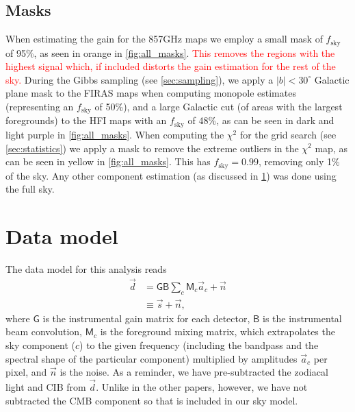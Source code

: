 \documentclass{aa}
\def\,{\thinspace}
\newcommand{\edit}[1]{\textcolor{red}{#1}}
\begin{document}
\subsection{Masks}
\label{sec:masks}
When estimating the gain for the 857\,GHz maps we employ a small mask of $f_\mathrm{sky}$ of 95\%, as seen in orange in \cref{fig:all_masks}. \edit{This removes the regions with the highest signal which, if included distorts the gain estimation for the rest of the sky.}  
During the Gibbs sampling (see \cref{sec:sampling}), we apply a $|b|<30^\circ$ Galactic plane mask to the FIRAS maps when computing monopole estimates (representing an $f_\mathrm{sky}$ of 50\%), and a large Galactic cut (of areas with the largest foregrounds) to the HFI maps with an $f_\mathrm{sky}$ of 48\%, as can be seen in dark and light purple in \cref{fig:all_masks}. 
When computing the $\chi^2$ for the grid search (see \cref{sec:statistics}) we apply a mask to remove the extreme outliers in the $\chi^2$ map, as can be seen in yellow in \cref{fig:all_masks}. This has $f_\mathrm{sky}=0.99$, removing only 1\% of the sky. 
Any other component estimation (as discussed in \cref{sec:skymodel}) was done using the full sky.
\section{Data model}
\label{sec:skymodel}
The data model for this analysis reads
\begin{align}
    \vec{d}& =\mathsf{G}\mathsf{B}\sum_c \mathsf{M}_{c}\vec{a}_{c}+\vec{n}\nonumber\\
    & \equiv \vec{s}+ \vec{n},
\label{equ:dataModel}
\end{align}
where $\mathsf{G}$ is the instrumental gain matrix for each detector, $\mathsf{B}$ is the instrumental beam convolution, $\mathsf{M}_{c}$ is the foreground mixing matrix, which extrapolates the sky component ($c$) to the given frequency (including the bandpass and the spectral shape of the particular component) multiplied by amplitudes $\vec{a}_{c}$ per pixel, and $\vec{n}$ is the noise. As a reminder, we have pre-subtracted the zodiacal light and CIB from $\vec{d}$. Unlike in the other papers, however, we have not subtracted the CMB component so that is included in our sky model.
\end{document}
